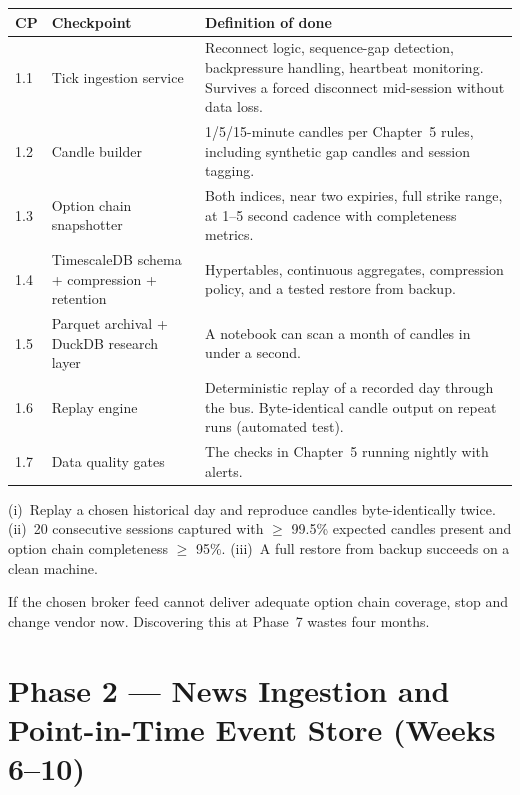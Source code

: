 \begin{longtable}{@{}p{1.4cm}p{6.0cm}p{7.0cm}@{}}
\toprule
\textbf{CP} & \textbf{Checkpoint} & \textbf{Definition of done}\\
\midrule
1.1 & Tick ingestion service & Reconnect logic, sequence-gap detection,
backpressure handling, heartbeat monitoring. Survives a forced disconnect
mid-session without data loss.\\
1.2 & Candle builder & 1/5/15-minute candles per Chapter~5 rules, including
synthetic gap candles and session tagging.\\
1.3 & Option chain snapshotter & Both indices, near two expiries, full strike
range, at 1--5 second cadence with completeness metrics.\\
1.4 & TimescaleDB schema + compression + retention & Hypertables, continuous
aggregates, compression policy, and a tested restore from backup.\\
1.5 & Parquet archival + DuckDB research layer & A notebook can scan a month of
candles in under a second.\\
1.6 & Replay engine & Deterministic replay of a recorded day through the bus.
Byte-identical candle output on repeat runs (automated test).\\
1.7 & Data quality gates & The checks in Chapter~5 running nightly with alerts.\\
\bottomrule
\end{longtable}

\begin{gatebox}[title={Gate G1}]
(i)~Replay a chosen historical day and reproduce candles byte-identically twice.
(ii)~20 consecutive sessions captured with $\ge$ 99.5\% expected candles present
and option chain completeness $\ge$ 95\%. (iii)~A full restore from backup
succeeds on a clean machine.
\end{gatebox}

\begin{warnbox}[title={Kill criteria for P1}]
If the chosen broker feed cannot deliver adequate option chain coverage, stop and
change vendor now. Discovering this at Phase~7 wastes four months.
\end{warnbox}

\section{Phase 2 --- News Ingestion and Point-in-Time Event Store (Weeks 6--10)}

